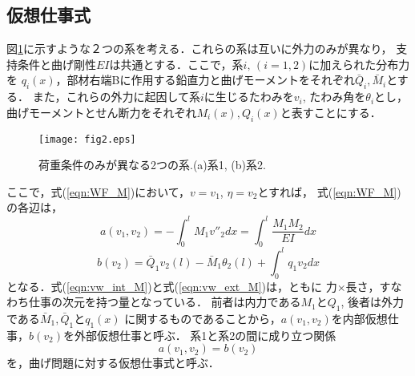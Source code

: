 \documentclass[10pt,a4j]{jarticle}
\begin{document}
\subsection{仮想仕事式}
図\ref{fig:fig2_2}に示すような２つの系を考える．これらの系は互いに外力のみが異なり，
支持条件と曲げ剛性$EI$は共通とする．ここで，系$i,\, (i=1,2)$に加えられた分布力を
$q_i(x)$，部材右端Bに作用する鉛直力と曲げモーメントをそれぞれ$\bar Q_i, \bar M_i$とする．
また，これらの外力に起因して系$i$に生じるたわみを$v_i$, たわみ角を$\theta_i$とし，
曲げモーメントとせん断力をそれぞれ$M_i(x), Q_i(x)$と表すことにする．
\begin{figure}[h]
	\begin{center}
	\texttt{[image: fig2.eps]} 
	\end{center}
	\caption{荷重条件のみが異なる2つの系.(a)系1, (b)系2.} 
	\label{fig:fig2_2}
\end{figure}
ここで，式(\ref{eqn:WF_M})において，$v=v_1$, $\eta=v_2$とすれば，
式(\ref{eqn:WF_M})の各辺は，
\begin{equation}
	a(v_1,v_2)=-\int_0^l M_1v''_2dx = \int_0^l\frac{M_1M_2}{EI}dx
	\label{eqn:vw_int_M}
\end{equation}
\begin{equation}
	b(v_2)=\bar Q_1 v_2(l)-\bar M_1  \theta_2(l) +\int_0^l q_1 v_2dx
	\label{eqn:vw_ext_M}
\end{equation}
となる．式(\ref{eqn:vw_int_M})と式(\ref{eqn:vw_ext_M})は，ともに
力$\times$長さ，すなわち仕事の次元を持つ量となっている．
前者は内力である$M_1$と$Q_1$, 後者は外力である$\bar M_1, \bar Q_1$と$q_1(x)$
に関するものであることから，$a(v_1,v_2)$を内部仮想仕事，$b(v_2)$を外部仮想仕事と呼ぶ．
系1と系2の間に成り立つ関係
\begin{equation}
	a(v_1,v_2)=b(v_2)
	\label{eqn:vw_eq_M}
\end{equation}
を，曲げ問題に対する仮想仕事式と呼ぶ．
\end{document}
